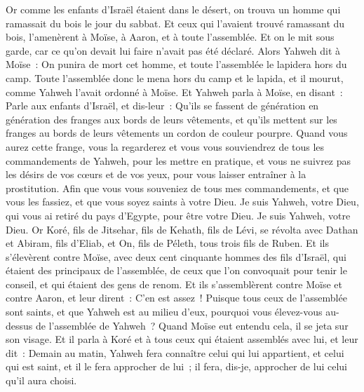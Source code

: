 \begin{multicols}{2}
Or comme les enfants d'Israël étaient dans le désert, on trouva un homme qui ramassait du bois le jour du sabbat.
Et ceux qui l'avaient trouvé ramassant du bois, l'amenèrent à Moïse, à Aaron, et à toute l'assemblée.
Et on le mit sous garde, car ce qu'on devait lui faire n'avait pas été déclaré.
Alors Yahweh dit à Moïse~: On punira de mort cet homme, et toute l'assemblée le lapidera hors du camp.
Toute l'assemblée donc le mena hors du camp et le lapida, et il mourut, comme Yahweh l'avait ordonné à Moïse.
Et Yahweh parla à Moïse, en disant~:
Parle aux enfants d'Israël, et dis-leur~: Qu'ils se fassent de génération en génération des franges aux bords de leurs vêtements, et qu'ils mettent sur les franges au bords de leurs vêtements un cordon de couleur pourpre.
Quand vous aurez cette frange, vous la regarderez et vous vous souviendrez de tous les commandements de Yahweh, pour les mettre en pratique, et vous ne suivrez pas les désirs de vos cœurs et de vos yeux, pour vous laisser entraîner à la prostitution.
Afin que vous vous souveniez de tous mes commandements, et que vous les fassiez, et que vous soyez saints à votre Dieu.
Je suis Yahweh, votre Dieu, qui vous ai retiré du pays d'Egypte, pour être votre Dieu. Je suis Yahweh, votre Dieu.
\VerseOne{}Or Koré, fils de Jitsehar, fils de Kehath, fils de Lévi, se révolta avec Dathan et Abiram, fils d'Eliab, et On, fils de Péleth, tous trois fils de Ruben.
Et ils s'élevèrent contre Moïse, avec deux cent cinquante hommes des fils d'Israël, qui étaient des principaux de l'assemblée, de ceux que l'on convoquait pour tenir le conseil, et qui étaient des gens de renom.
Et ils s'assemblèrent contre Moïse et contre Aaron, et leur dirent~: C'en est assez~! Puisque tous ceux de l'assemblée sont saints, et que Yahweh est au milieu d'eux, pourquoi vous élevez-vous au-dessus de l'assemblée de Yahweh~?
Quand Moïse eut entendu cela, il se jeta sur son visage.
Et il parla à Koré et à tous ceux qui étaient assemblés avec lui, et leur dit~: Demain au matin, Yahweh fera connaître celui qui lui appartient, et celui qui est saint, et il le fera approcher de lui~; il fera, dis-je, approcher de lui celui qu'il aura choisi.

\end{multicols}
